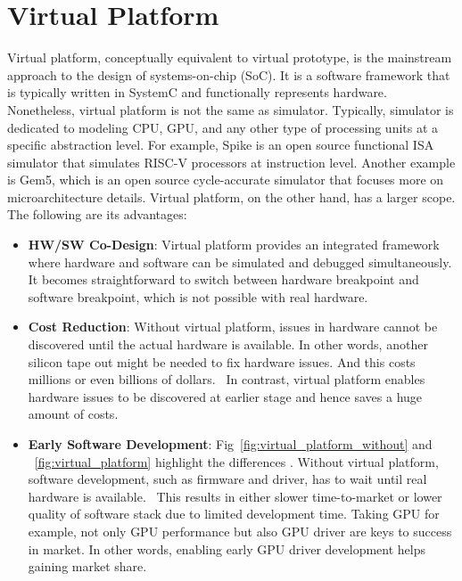 
\section{Virtual Platform}

Virtual platform, conceptually equivalent to virtual prototype, is the mainstream approach to the design of systems-on-chip (SoC). It is a software framework that is typically written in SystemC and functionally represents hardware. Nonetheless, virtual platform is not the same as simulator. Typically, simulator is dedicated to modeling CPU, GPU, and any other type of processing units at a specific abstraction level. For example, Spike is an open source functional ISA simulator that simulates RISC-V processors at instruction level. Another example is Gem5, which is an open source cycle-accurate simulator that focuses more on microarchitecture details.
Virtual platform, on the other hand, has a larger scope. The following are its advantages:
\begin{itemize}
    \item \textbf{HW/SW Co-Design}: Virtual platform provides an integrated framework where hardware and software can be simulated and debugged simultaneously. It becomes straightforward to switch between hardware breakpoint and software breakpoint, which is not possible with real hardware. ~\cite{hw_sw_codesign}
    \item \textbf{Cost Reduction}: Without virtual platform, issues in hardware cannot be discovered until the actual hardware is available. In other words, another silicon tape out might be needed to fix hardware issues. And this costs millions or even billions of dollars.~\cite{virtual_platform} In contrast, virtual platform enables hardware issues to be discovered at earlier stage and hence saves a huge amount of costs. 
    \item \textbf{Early Software Development}: Fig~\ref{fig:virtual_platform_without} and ~\ref{fig:virtual_platform} highlight the differences . Without virtual platform, software development, such as firmware and driver, has to wait until real hardware is available.~\cite{early_sw_development} This results in either slower time-to-market or lower quality of software stack due to limited development time. Taking GPU for example, not only GPU performance but also GPU driver are keys to success in market. In other words, enabling early GPU driver development helps gaining market share.  
\end{itemize}

